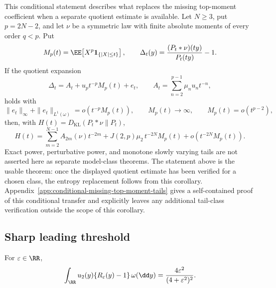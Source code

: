\begin{corollary}%
\label{cor:main-body-conditional-missing-top-moment-tail}
This conditional statement describes what replaces the missing
top-moment coefficient when a separate quotient estimate is available.  Let
\(N\ge3\), put \(p=2N-2\), and let \(\nu\) be a symmetric law with finite
absolute moments of every order \(q<p\).  Put
\[
M_p(t)=\EE\!\left[X^p\mathbf1_{\{|X|\le t\}}\right],
\qquad
\Delta_t(y)=\frac{(P_t*\nu)(ty)}{P_t(ty)}-1 .
\]
If the quotient expansion
\[
\Delta_t=A_t+u_p t^{-p}M_p(t)+e_t,\qquad
A_t=\sum_{n=2}^{p-1}\mu_nu_n t^{-n},
\]
holds with
\[
\|e_t\|_\infty+\|e_t\|_{L^1(\omega)}
=o(t^{-p}M_p(t)),\qquad
M_p(t)\to\infty,\qquad M_p(t)=o(t^{p-2}),
\]
then, with \(H(t)=D_{\mathrm{KL}}(P_t*\nu\|P_t)\),
\[
H(t)=
\sum_{m=2}^{N-1}A_{2m}(\nu)t^{-2m}
+J(2,p)\mu_2\,t^{-2N}M_p(t)
+o(t^{-2N}M_p(t)).
\]
Exact power, perturbative power, and monotone slowly varying tails are
not asserted here as separate model-class theorems.  The statement
above is the usable theorem: once the displayed quotient estimate has been
verified for a chosen class, the entropy replacement follows from this
corollary.  Appendix~\ref{app:conditional-missing-top-moment-tails} gives a
self-contained proof of this conditional transfer and explicitly leaves any
additional tail-class verification outside the scope of this corollary.
\end{corollary}

\subsection{Sharp leading threshold}

\begin{lemma}%
\label{lem:second-mode-cauchy-translate-transform}
For \(\varepsilon\in\RR\),
\[
\int_{\RR}u_2(y)\{R_\varepsilon(y)-1\}\,\omega(\dd y)
=\frac{4\varepsilon^2}{(4+\varepsilon^2)^2}.
\]
\end{lemma}

